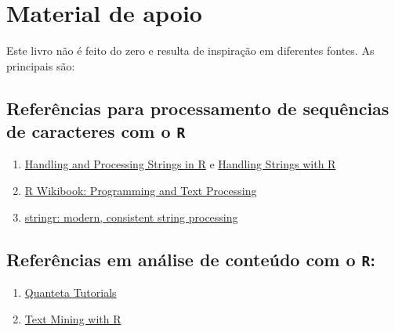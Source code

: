 \documentclass[]{book}
\providecommand{\tightlist}{%
  \setlength{\itemsep}{0pt}\setlength{\parskip}{0pt}}
\begin{document}
\hypertarget{material-de-apoio}{%
\section{Material de apoio}\label{material-de-apoio}}

Este livro não é feito do zero e resulta de inspiração em diferentes fontes. As principais são:

\hypertarget{referuxeancias-para-processamento-de-sequuxeancias-de-caracteres-com-o-r}{%
\subsection{\texorpdfstring{Referências para processamento de sequências de caracteres com o \texttt{R}}{Referências para processamento de sequências de caracteres com o R}}\label{referuxeancias-para-processamento-de-sequuxeancias-de-caracteres-com-o-r}}

\begin{enumerate}
\def\labelenumi{\arabic{enumi}.}
\item
  \href{https://www.gastonsanchez.com/Handling_and_Processing_Strings_in_R.pdf}{Handling and Processing Strings in R} e \href{https://www.gastonsanchez.com/r4strings/}{Handling Strings with R}
\item
  \href{http://en.wikibooks.org/wiki/R_Programming/Text_Processing}{R Wikibook: Programming and Text Processing}
\item
  \href{https://journal.r-project.org/archive/2010-2/RJournal_2010-2_Wickham.pdf}{stringr: modern, consistent string
  processing}
\end{enumerate}

\hypertarget{referuxeancias-em-anuxe1lise-de-conteuxfado-com-o-r}{%
\subsection{\texorpdfstring{Referências em análise de conteúdo com o \texttt{R}:}{Referências em análise de conteúdo com o R:}}\label{referuxeancias-em-anuxe1lise-de-conteuxfado-com-o-r}}

\begin{enumerate}
\def\labelenumi{\arabic{enumi}.}
\tightlist
\item
  \href{https://tutorials.quanteda.io/}{Quanteta Tutorials}
\item
  \href{https://www.tidytextmining.com/}{Text Mining with R}
\end{enumerate}
\end{document}
